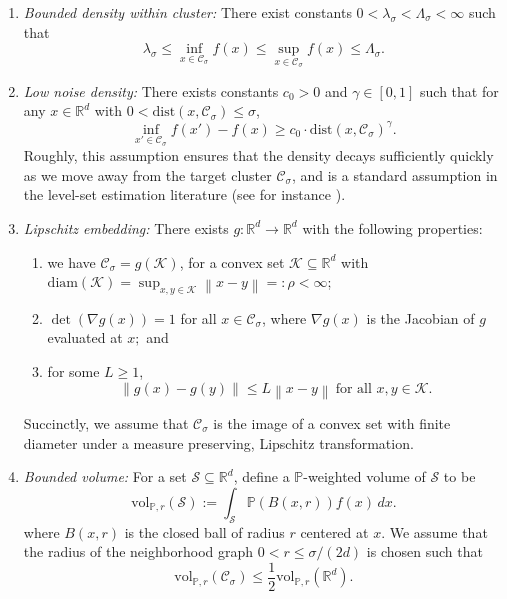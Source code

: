\documentclass[11pt,twoside]{article}
\newcommand{\diam}{\rho}
\newcommand{\vol}{\mathrm{vol}}
\newcommand{\Reals}{\mathbb{R}}
\newcommand{\Rd}{\Reals^d}
\newcommand{\norm}[1]{\left\lVert#1\right\rVert}
\newcommand{\1}{\mathbbm{1}}
\newcommand{\dist}{\mathrm{dist}}
\newcommand{\Pbb}{\mathbb{P}}
\newcommand{\Cset}{\mathcal{C}}
\newcommand{\Csig}{\Cset_{\sigma}}
\begin{document}
\begin{enumerate}[label=(A\arabic*)]
\item
  \label{asmp: bounded_density}
  \emph{Bounded density within cluster:} There exist constants
  $0<\lambda_{\sigma}< \Lambda_{\sigma}<\infty$ such that 
  $$
  \lambda_{\sigma} \leq \inf_{x \in \Csig} f(x) \leq \sup_{x \in \Csig} f(x)
  \leq \Lambda_{\sigma}.
  $$

\item 
  \label{asmp: low_noise_density}
  \emph{Low noise density:} There exists constants $c_0 > 0$ and $\gamma \in
  [0,1]$ such that for any $x \in \Rd$ with $0 < \dist(x, \Csig) \leq \sigma$,     
  $$
  \inf_{x' \in \Csig} f(x') - f(x) \geq  c_0 \cdot \dist(x, \Csig)^{\gamma}.  
  $$
  Roughly, this assumption ensures that the density decays sufficiently quickly
  as we move away from the target cluster $\Csig$, and is a standard assumption
  in the level-set estimation literature (see for instance \citet{singh2009}).
  
\item
  \label{asmp: embedding}
  \emph{Lipschitz embedding:}
  There exists $g: \Reals^d \to \Reals^d$ with the following properties: 
  \begin{enumerate}
  \item we have $\Csig = g(\mathcal{K})$, for a convex set $\mathcal{K}
    \subseteq \Rd$ with $\mathrm{diam}(\mathcal{K}) = \sup_{x,y \in
      \mathcal{K}}\norm{x - y} =: \diam < \infty$;
  \item $\det(\nabla g (x)) = 1$ for all $x \in \Csig$, where $\nabla g(x)$ is
    the Jacobian of $g$ evaluated at $x;$ and 
  \item for some $L \geq 1$,   
    $$
    \norm{g(x) - g(y)} \leq L \norm{x - y} ~
    \text{for all $x,y \in \mathcal{K}$}. 
    $$
  \end{enumerate}
  Succinctly, we assume that $\Csig$ is the image of a convex set with finite
  diameter under a measure preserving, Lipschitz transformation. 

\item
  \label{asmp: bounded_volume}
  \emph{Bounded volume:}
  For a set $\mathcal{S} \subseteq \Reals^d$, define a $\Pbb$-weighted volume of 
  $\mathcal{S}$ to be  
  \begin{equation}
  \label{eqn:volume}
  \vol_{\Pbb,r}(\mathcal{S}) := \int_{\mathcal{S}} \Pbb(B(x,r)) f(x) \, dx.
  \end{equation}
  where $B(x,r)$ is the closed ball of radius $r$ centered at $x$. We assume
  that the radius of the neighborhood graph $0 < r \leq \sigma/(2d)$ is chosen 
  such that  
  $$
  \vol_{\Pbb,r}(\Cset_\sigma) \leq \frac{1}{2} \vol_{\Pbb,r}(\Reals^d). 
  $$
\end{enumerate}
\end{document}
